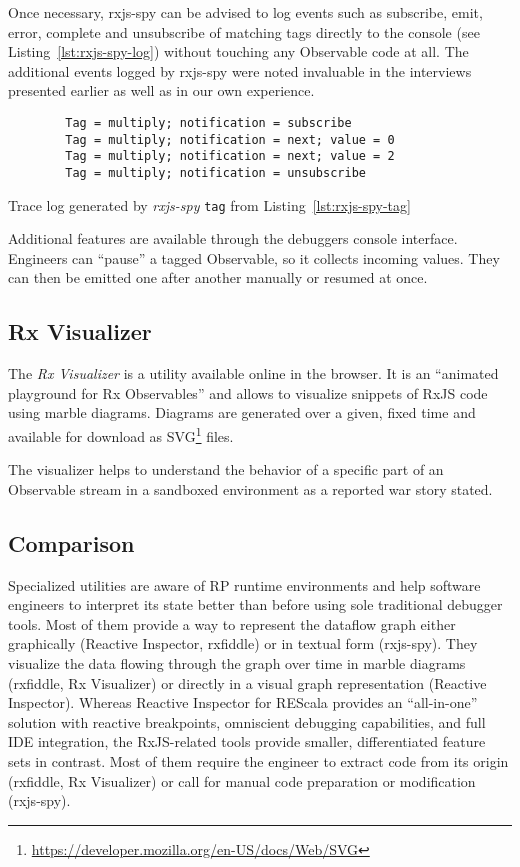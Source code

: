 \documentclass[12pt,a4paper]{article}
\begin{document}
Once necessary, rxjs-spy can be advised to log events such as subscribe, emit, error, complete and unsubscribe of matching tags directly to the console (see Listing~\ref{lst:rxjs-spy-log}) without touching any Observable code at all. The additional events logged by rxjs-spy were noted invaluable in the interviews presented earlier as well as in our own experience.

\begin{listing}[H]
	\begin{verbatim}
		Tag = multiply; notification = subscribe
		Tag = multiply; notification = next; value = 0
		Tag = multiply; notification = next; value = 2
		Tag = multiply; notification = unsubscribe
	\end{verbatim}
	\caption{Trace log generated by \emph{rxjs-spy} \texttt{tag} from Listing~\ref{lst:rxjs-spy-tag}}
	\label{lst:rxjs-spy-log}
\end{listing}

Additional features are available through the debuggers console interface. Engineers can ``pause'' a tagged Observable, so it collects incoming values. They can then be emitted one after another manually or resumed at once.

\subsection{Rx Visualizer}

The \emph{Rx Visualizer}\cite{rxviz} is a utility available online in the browser. It is an ``animated playground for Rx Observables''\cite{rxviz} and allows to visualize snippets of RxJS code using marble diagrams. Diagrams are generated over a given, fixed time and available for download as SVG\footnote{\url{https://developer.mozilla.org/en-US/docs/Web/SVG}} files.

The visualizer helps to understand the behavior of a specific part of an Observable stream in a sandboxed environment as a reported war story stated.

\subsection{Comparison}

Specialized utilities are aware of RP runtime environments and help software engineers to interpret its state better than before using sole traditional debugger tools. Most of them provide a way to represent the dataflow graph either graphically (Reactive Inspector, rxfiddle) or in textual form (rxjs-spy). They visualize the data flowing through the graph over time in marble diagrams (rxfiddle, Rx Visualizer) or directly in a visual graph representation (Reactive Inspector). Whereas Reactive Inspector for REScala provides an ``all-in-one'' solution with reactive breakpoints, omniscient debugging capabilities, and full IDE integration, the RxJS-related tools provide smaller, differentiated feature sets in contrast. Most of them require the engineer to extract code from its origin (rxfiddle, Rx Visualizer) or call for manual code preparation or modification (rxjs-spy).
\end{document}
